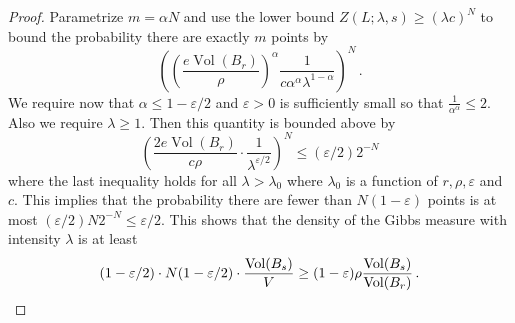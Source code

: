 \documentclass[10pt,a4paper]{amsart}
\newcommand{\Vol}{\operatorname{Vol}}
\newcommand{\eps}{\varepsilon}
\begin{document}
\begin{proof}
    Parametrize $m = \alpha N$ and use the lower bound $Z(L;\lambda,s) 
        \ge (\lambda c)^N$ to bound the probability there are exactly $m$ points by
    $$ \left(\left(\frac{e \Vol(B_r)}{\rho} \right)^\alpha \frac{1}{c\alpha^\alpha \lambda^{1 - \alpha}} \right)^N\,.  $$
    We require now that $\alpha \leq 1-\eps/2$ and $\eps>0$ is sufficiently small so that $\frac{1}{\alpha^\alpha} \le 2$. Also we require $\lambda \geq 1$. Then this quantity is bounded above by \begin{equation}
        \left(\frac{2 e \Vol(B_r)}{c\rho}  \cdot \frac{1}{ \lambda^{\eps/2}} \right)^N \leq (\eps/2) 2^{-N}
    \end{equation} 
    where the last inequality holds for all $\lambda > \lambda_0$ where $\lambda_0$ is a function of $r,\rho,\eps$ and $c$.  This implies that the probability there are fewer than $N(1-\eps)$ points is at most $(\eps/2) N 2^{-N} \leq \eps/2$.  This shows that the density of the Gibbs measure with intensity $\lambda$ is at least \begin{equation*}(1- \eps/2)\cdot N(1 - \eps/2) \cdot \frac{\Vol(B_s)}{V} \geq (1 - \eps) \rho \frac{\Vol(B_s)}{\Vol(B_r)}\,. \qedhere \end{equation*}
\end{proof}
\end{document}
